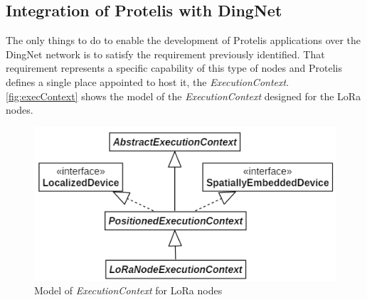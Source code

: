 \subsection{Integration of Protelis with DingNet}
\label{sec:PoverD}
The only things to do to enable the development of Protelis applications over the DingNet network is to satisfy the requirement previously identified.
That requirement represents a specific capability of this type of nodes and Protelis defines a single place appointed to host it, the \mbox{\textit{ExecutionContext}}.
\autoref{fig:execContext} shows the model of the \mbox{\textit{ExecutionContext}} designed for the LoRa nodes. 

\begin{figure}[h]
    \centering
    \includegraphics{figures/execContext.png}
    \caption{Model of \textit{ExecutionContext} for LoRa nodes}
    \label{fig:execContext}
\end{figure}

